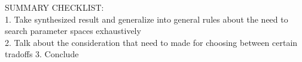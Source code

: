 SUMMARY CHECKLIST:\\
1. Take synthesized result and generalize into general rules about the need to search parameter spaces exhaustively\\
2. Talk about the consideration that need to made for choosing between certain tradoffs
3. Conclude
